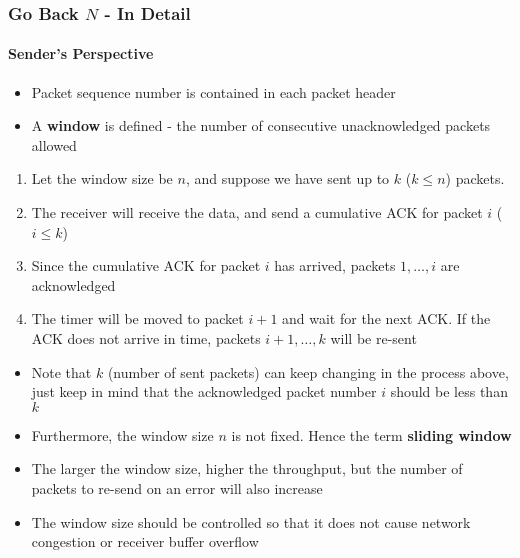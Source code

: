 \subsubsection{Go Back $N$ - In Detail}
\paragraph{Sender's Perspective}
\begin{itemize}
	\item Packet sequence number is contained in each packet header
	\item A \textbf{window} is defined - the number of consecutive unacknowledged packets allowed
\end{itemize}
\begin{enumerate}
	\item Let the window size be $n$, and suppose we have sent up to $k$ ($k\leq n$) packets.
	\item The receiver will receive the data, and send a cumulative ACK for packet $i$ ($i\leq k$)
	\item Since the cumulative ACK for packet $i$ has arrived, packets $1, \dots, i$ are acknowledged
	\item The timer will be moved to packet $i + 1$ and wait for the next ACK. If the ACK does not arrive in time, packets $i+1, \dots, k$ will be re-sent
\end{enumerate}
\begin{itemize}
	\item Note that $k$ (number of sent packets) can keep changing in the process above, just keep in mind that the acknowledged packet number $i$ should be less than $k$
	\item Furthermore, the window size $n$ is not fixed. Hence the term \textbf{sliding window}
	\item The larger the window size, higher the throughput, but the number of packets to re-send on an error will also increase
	\item The window size should be controlled so that it does not cause network congestion or receiver buffer overflow
\end{itemize}

